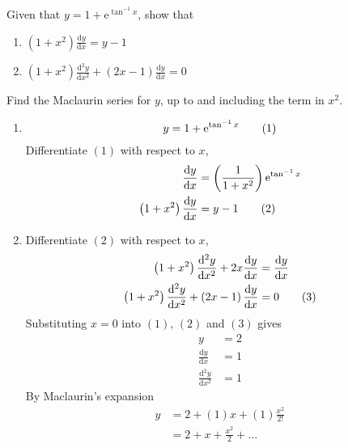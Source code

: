\documentclass[11pt,a4paper]{book}
\begin{document}
\begin{example}

Given that $y=1+\mathrm{e}^{\tan^{-1}x}$, show that

\begin{enumerate}[label=(\alph*)]
\item ${\displaystyle \left(1+x^{2}\right)\frac{\mathrm{d}y}{\mathrm{d}x}=y-1}$
\item ${\displaystyle \left(1+x^{2}\right)\frac{\mathrm{d}^{2}y}{\mathrm{d}x^{2}}+\left(2x-1\right)\frac{\mathrm{d}y}{\mathrm{d}x}=0}$
\end{enumerate}

Find the Maclaurin series for $y$, up to and including the term in
$x^{2}$.

\Solution

\begin{enumerate}[label=(\alph*)]

\item

\begin{equation}
y=1+\mathrm{e}^{\tan^{-1}x}\tag{{1}}
\end{equation}
Differentiate $\left(1\right)$ with respect to $x$,
\begin{align}
\frac{\mathrm{d}y}{\mathrm{d}x} & =\left(\frac{1}{1+x^{2}}\right)\mathrm{e}^{\tan^{-1}x}\nonumber \\
\left(1+x^{2}\right)\frac{\mathrm{d}y}{\mathrm{d}x} & =y-1\tag{{2}}
\end{align}

\item Differentiate $\left(2\right)$ with respect to $x$,
\begin{align}
\left(1+x^{2}\right)\frac{\mathrm{d}^{2}y}{\mathrm{d}x^{2}}+2x\frac{\mathrm{d}y}{\mathrm{d}x} & =\frac{\mathrm{d}y}{\mathrm{d}x}\nonumber \\
\left(1+x^{2}\right)\frac{\mathrm{d}^{2}y}{\mathrm{d}x^{2}}+\left(2x-1\right)\frac{\mathrm{d}y}{\mathrm{d}x} & =0\tag{{3}}
\end{align}
Substituting $x=0$ into $\left(1\right)$, $\left(2\right)$ and
$\left(3\right)$ gives
\begin{align*}
y & =2\\
\frac{\mathrm{d}y}{\mathrm{d}x} & =1\\
\frac{\mathrm{d}^{2}y}{\mathrm{d}x^{2}} & =1
\end{align*}
By Maclaurin's expansion
\begin{align*}
y & =2+\left(1\right)x+\left(1\right)\frac{x^{2}}{2!}\\
 & =2+x+\frac{x^{2}}{2}+\ldots
\end{align*}

\end{enumerate}

\end{example}
\end{document}
